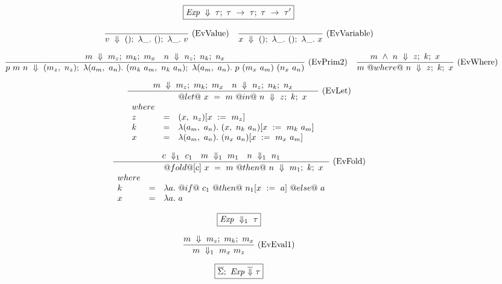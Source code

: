 
\newcommand\LamX[1] {\lambda{} #1.~}
\newcommand\LamU {\LamX{\_}}

\newcommand\LamXX[2] {\lambda{} #1~#2.~}
\newcommand\LamUU {\LamXX{\_}{\_}}

\begin{figure*}

$$
\boxed{\mathit{Exp} ~\Downarrow~ \tau;~\tau~\to~\tau;~\tau~\to~\tau'}
$$

$$
\ruleI
{
}
{
    \Bigstep{v}{()}{\LamU ()}{\LamU v}
}
\textrm{(EvValue)}
\quad
\ruleI
{
}
{
    \Bigstep{x}{()}{\LamU ()}{\LamU x}
}
\textrm{(EvVariable)}
$$

$$
\ruleI
{
    \Bigstep{m}{m_z}{m_k}{m_x}
    \quad
    \Bigstep{n}{n_z}{n_k}{n_x}
}
{
    \Bigstep{p~m~n}{(m_z,~n_z)}{\LamX{(a_m,~a_n)} (m_k~a_m,~n_k~a_n)}{\LamX{(a_m,~a_n)} p~(m_x~a_m)~(n_x~a_n)}
}
\textrm{(EvPrim2)}
\quad
\ruleI
{
    \Bigstep{m~\wedge~n}{z}{k}{x}
}
{
    \Bigstep{m~@where@~n}{z}{k}{x}
}
\textrm{(EvWhere)}
$$

$$
\ruleI
{
    \Bigstep{m}{m_z}{m_k}{m_x}
    \quad
    \Bigstep{n}{n_z}{n_k}{n_x}
}
{
    \begin{array}{lcl}
    & & \Bigstep{@let@~x~=~m~@in@~n}{z}{k}{x}
    \\
    \mit{where}
    \\
    z & = & (x,~n_z)[x~:=~m_z]
    \\
    k & = & \LamX{(a_m,~a_n)} (x,~n_k~a_n)[x~:=~m_k~a_m]
    \\
    x & = & \LamX{(a_m,~a_n)} (n_x~a_n)[x~:=~m_x~a_m]
    \end{array}
}
\textrm{(EvLet)}
$$

$$
\ruleI
{
    \BigstepV{c}{c_1}
    \quad
    \BigstepV{m}{m_1}
    \quad
    \BigstepV{n}{n_1}
}
{
    \begin{array}{lcl}
    & & \Bigstep{@fold@[c]~x~=~m~@then@~n}{m_1}{k}{x}
    \\
    \mit{where}
    \\
    k & = & \LamX{a} @if@~c_1~@then@~n_1[x~:=~a]~@else@~a
    \\
    x & = & \LamX{a} a
    \end{array}
}
\textrm{(EvFold)}
$$


$$
\boxed{\mathit{Exp} ~\Downarrow_1~ \tau}
$$

$$
\frac {\displaystyle 
    m ~\Downarrow~ m_z;~m_k;~m_x
} {\displaystyle 
    m ~\Downarrow_1~ m_x~m_z
} \ 
\textrm{(EvEval1)}
$$


$$
\boxed{\overline{\Sigma};~\mathit{Exp} ~\overline{\Downarrow}~ \tau}
$$


\end{figure*}

